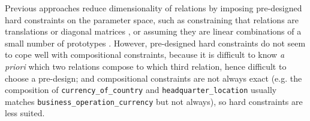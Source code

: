\documentclass[11pt,a4paper]{article}
\begin{document}
Previous approaches reduce dimensionality of relations by imposing 
pre-designed hard constraints on the parameter space, such as constraining that 
relations are translations \citep{DBLP:conf/nips/BordesUGWY13} or diagonal matrices \citep{Yang2015}, or 
assuming they are linear combinations of a small number of prototypes \citep{xie-EtAl:2017:Long}.
However, pre-designed hard constraints do not seem to cope well with compositional constraints, because 
it is difficult to know \emph{a priori} 
which two relations compose to which third relation, hence difficult to choose a pre-design; and 
compositional constraints are not always exact (e.g. the composition 
of \texttt{currency\_of\_country} and \texttt{headquarter\_location} usually matches 
\texttt{business\_operation\_currency} but not always), so hard constraints are 
less suited. 



\end{document}
